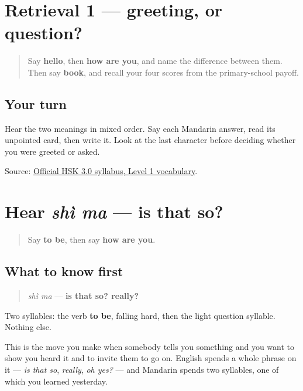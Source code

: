 \section[Practice]{Retrieval 1 — greeting, or question?}

\label{lesson:ZH-R19-ma-two-r1}



\begin{quote}
Say \textbf{hello}, then \textbf{how are you}, and name the difference between them. Then say \textbf{book}, and recall your four scores from the primary-school payoff.
\end{quote}

\subsection*{Your turn}
Hear the two meanings in mixed order. Say each Mandarin answer, read its unpointed card, then write it. Look at the last character before deciding whether you were greeted or asked.

\begin{tcolorbox}[breakable,colback=teal!4,colframe=teal!35!black,title={Before you move on}]
Source: \href{https://hsk.cn-bj.ufileos.com/3.0/\%E6\%96\%B0\%E7\%89\%88HSK\%E8\%80\%83\%E8\%AF\%95\%E5\%A4\%A7\%E7\%BA\%B21219.pdf}{Official HSK 3.0 syllabus, Level 1 vocabulary}.
\end{tcolorbox}
\section[shì ma]{Hear \emph{shì ma} — is that so?}

\label{lesson:ZH-C19-hear-shima}



\begin{quote}
Say \textbf{to be}, then say \textbf{how are you}.
\end{quote}

\subsection*{What to know first}
\begin{quote}
\emph{shì ma} — \textbf{is that so? really?}
\end{quote}

Two syllables: the verb \textbf{to be}, falling hard, then the light question syllable. Nothing else.

This is the move you make when somebody tells you something and you want to show you heard it and to invite them to go on. English spends a whole phrase on it — \emph{is that so}, \emph{really}, \emph{oh yes?} — and Mandarin spends two syllables, one of which you learned yesterday.

